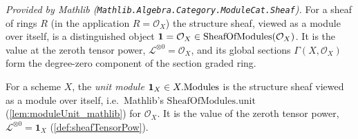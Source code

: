 \begin{lemma}
  \label{lem:moduleUnit_mathlib}
  \mathlibok
  \textit{Provided by Mathlib
  (\texttt{Mathlib.Algebra.Category.ModuleCat.Sheaf}).}
  For a sheaf of rings \(R\) (in the application \(R = \mathcal{O}_X\)) the
  structure sheaf, viewed as a module over itself, is a distinguished object
  \(\mathbf{1} = \mathcal{O}_X \in \mathrm{SheafOfModules}(\mathcal{O}_X)\). It is the value at
  the zeroth tensor power, \(\mathcal{L}^{\otimes 0} = \mathcal{O}_X\), and its
  global sections \(\Gamma(X, \mathcal{O}_X)\) form the degree-zero component of
  the section graded ring.
\end{lemma}


\begin{definition}
  \label{def:unitModule}
  For a scheme \(X\), the \emph{unit module} \(\mathbf{1}_X \in X.\mathrm{Modules}\) is the
  structure sheaf viewed as a module over itself, i.e.\ Mathlib's
  \(\mathrm{SheafOfModules.unit}\) (\cref{lem:moduleUnit_mathlib}) for
  \(\mathcal{O}_X\). It is the value of the zeroth tensor power,
  \(\mathcal{L}^{\otimes 0} = \mathbf{1}_X\) (\cref{def:sheafTensorPow}).
\end{definition}

